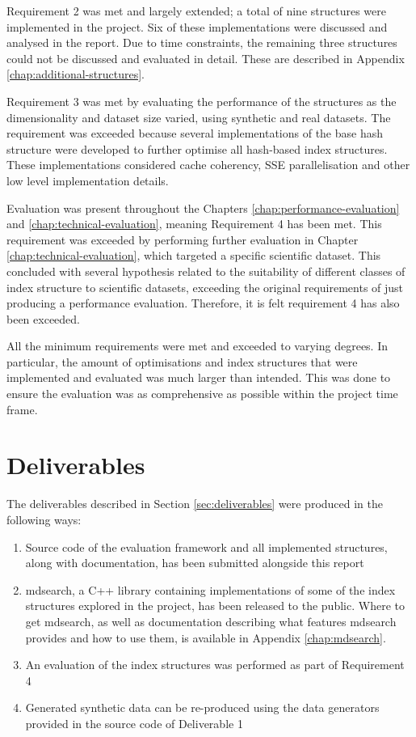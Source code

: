 Requirement 2 was met and largely extended; a total of nine structures were implemented in the project. Six of these implementations were discussed and analysed in the report. Due to time constraints, the remaining three structures could not be discussed and evaluated in detail. These are described in Appendix \ref{chap:additional-structures}. 

Requirement 3 was met by evaluating the performance of the structures as the dimensionality and dataset size varied, using synthetic and real datasets. The requirement was exceeded because several implementations of the base hash structure were developed to further optimise all hash-based index structures. These implementations considered cache coherency, SSE parallelisation and other low level implementation details. 

Evaluation was present throughout the Chapters \ref{chap:performance-evaluation} and \ref{chap:technical-evaluation}, meaning Requirement 4 has been met. This requirement was exceeded by performing further evaluation in Chapter \ref{chap:technical-evaluation}, which targeted a specific scientific dataset. This concluded with several hypothesis related to the suitability of different classes of index structure to scientific datasets, exceeding the original requirements of just producing a performance evaluation. Therefore, it is felt requirement 4 has also been exceeded.

All the minimum requirements were met and exceeded to varying degrees. In particular, the amount of optimisations and index structures that were implemented and evaluated was much larger than intended. This was done to ensure the evaluation was as comprehensive as possible within the project time frame.

\newpage

\section{Deliverables}

The deliverables described in Section \ref{sec:deliverables} were produced in the following ways:
\begin{enumerate}
	\item Source code of the evaluation framework and all implemented structures, along with documentation, has been submitted alongside this report
	\item mdsearch, a C++ library containing implementations of some of the index structures explored in the project, has been released to the public. Where to get mdsearch, as well as documentation describing what features mdsearch provides and how to use them, is available in Appendix \ref{chap:mdsearch}.
	\item An evaluation of the index structures was performed as part of Requirement 4
	\item Generated synthetic data can be re-produced using the data generators provided in the source code of Deliverable 1
\end{enumerate}

